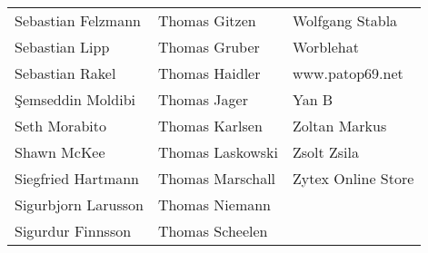 \begin{small}
\begin{tabular}{p{4cm}p{4cm}p{4cm}}
Sebastian Felzmann & Thomas Gitzen & Wolfgang Stabla \\
Sebastian Lipp & Thomas Gruber & Worblehat \\
Sebastian Rakel & Thomas Haidler & www.patop69.net \\
Şemseddin Moldibi & Thomas Jager & Yan B \\
Seth Morabito & Thomas Karlsen & Zoltan Markus \\
Shawn McKee & Thomas Laskowski & Zsolt Zsila \\
Siegfried Hartmann & Thomas Marschall & Zytex Online Store \\
Sigurbjorn Larusson & Thomas Niemann &  \\
Sigurdur Finnsson & Thomas Scheelen &  \\
\end{tabular}
\end{small}
\ifdefined\printmanual
\else
{}
\fi
